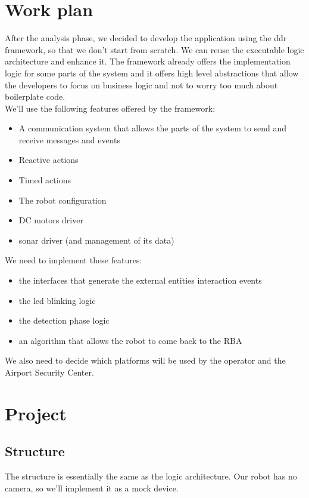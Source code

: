 \documentclass{llncs}
\newcommand{\labelsec}[1]{\label{sec:#1}}
\begin{document}
\section{Work plan}
\labelsec{wplan}
After the analysis phase, we decided to develop the application using the ddr framework, so that we don't start from scratch. We can reuse the executable logic architecture and enhance it. The framework already offers the implementation logic for some parts of the system and it offers high level abstractions that allow the developers to focus on business logic and not to worry too much about boilerplate code.\\
We'll use the following features offered by the framework:
\begin{itemize}
\item A communication system that allows the parts of the system to send and receive messages and events
\item Reactive actions
\item Timed actions
\item The robot configuration
\item DC motors driver
\item sonar driver (and management of its data)
\end{itemize}
We need to implement these features:
\begin{itemize}
\item the interfaces that generate the external entities interaction events
\item the led blinking logic
\item the detection phase logic
\item an algorithm that allows the robot to come back to the RBA
\end{itemize}
We also need to decide which platforms will be used by the operator and the Airport Security Center.\\

\section{Project}
\labelsec{Project}
\subsection{Structure}
The structure is essentially the same as the logic architecture. Our robot has no camera, so we'll implement it as a mock device.
\end{document}
